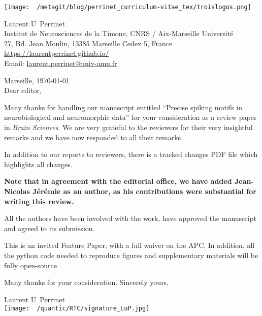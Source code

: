 \documentclass[10pt,english]{article}
\makeatletter
\newcommand{\LastName}{Perrinet}%
\newcommand{\FirstName}{Laurent U}%
\newcommand{\Institute}{Institut de Neurosciences de la Timone, CNRS / Aix-Marseille Universit\'e}%
\newcommand{\Address}{27, Bd. Jean Moulin, 13385 Marseille Cedex 5, France}%
\newcommand{\Website}{\url{https://laurentperrinet.github.io/}}%
\newcommand{\Email}{\url{laurent.perrinet@univ-amu.fr}}%
\makeatother
\begin{document}
\texttt{[image: ~/metagit/blog/perrinet\_curriculum-vitae\_tex/troislogos.png]}
\\
\vspace{.1\baselineskip}
\hrulefill
\vspace{.1\baselineskip}

\begin{flushright}
	\FirstName\  \LastName\  \\
	\Institute\\[6pt]
	\Address\\%
	\Website \\
	  Email: \Email \\[6pt]
\end{flushright}
\justifying
\vspace{1\baselineskip}
Marseille, \today\\[12pt] %
	
Dear editor,

Many thanks for handling our manuscript entitled ``Precise spiking motifs in neurobiological and neuromorphic data'' for your consideration as a review paper in \emph{Brain Sciences}. We are very grateful to the reviewers for their very insightful remarks and we have now responded to all their remarks. 


In addition to our reports to reviewers, there is a tracked changes PDF file which highlights all changes.

\textbf{ Note that in agreement with the editorial office, we have added Jean-Nicolas Jérémie as an author, as his contributions were substantial for writing this review.}

All the authors have been involved with the work, have approved the manuscript and agreed to its submission.

This is an invited Feature Paper, with a full waiver on the APC. In addition, all the python code needed to reproduce figures and supplementary materials will be fully open-source

Many thanks for your consideration.
\vspace{.2\baselineskip}
Sincerely yours,

\vspace{.1cm}

\FirstName\ \LastName \\

\texttt{[image: ~/quantic/RTC/signature\_LuP.jpg]}
\end{document}

